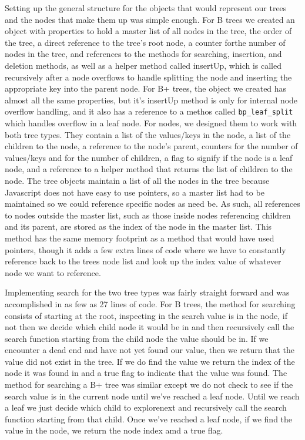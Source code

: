 Setting up the general structure for the objects that would represent
our trees and the nodes that make them up was simple enough.  For B
trees we created an object with properties to hold a master list of
all nodes in the tree, the order of the tree, a direct reference to
the tree's root node, a counter forthe number of nodes in the tree,
and references to the methods for searching, insertion, and deletion
methods, as well as a helper method called insertUp, which is called
recursively after a node overflows to handle splitting the node and
inserting the appropriate key into the parent node.  For B+ trees, the
object we created has almost all the same properties, but it's
insertUp method is only for internal node overflow handling, and it
also has a reference to a methos called \texttt{bp\_leaf\_split} which
handles overflow in a leaf node.  For nodes, we designed them to work
with both tree types.  They contain a list of the values/keys in the
node, a list of the children to the node, a reference to the node's
parent, counters for the number of values/keys and for the number of
children, a flag to signify if the node is a leaf node, and a
reference to a helper method that returns the list of children to the
node. The tree objects maintain a list of all the nodes in the tree
because Javascript does not have easy to use pointers, so a master
list had to be maintained so we could reference specific nodes as need
be.  As such, all references to nodes outside the master list, such as
those inside nodes referencing children and its parent, are stored as
the index of the node in the master list.  This method has the same
memory footprint as a method that would have used pointers, though it
adds a few extra lines of code where we have to constantly reference
back to the trees node list and look up the index value of whatever
node we want to reference.

Implementing search for the two tree types was fairly straight forward
and was accomplished in as few as 27 lines of code.  For B trees, the
method for searching consists of starting at the root, inspecting in
the search value is in the node, if not then we decide which child
node it would be in and then recursively call the search function
starting from the child node the value should be in.  If we encounter
a dead end and have not yet found our value, then we return that the
value did not exist in the tree.  If we do find the value we return
the index of the node it was found in and a true flag to indicate that
the value was found.  The method for searching a B+ tree was similar
except we do not check to see if the search value is in the current
node until we've reached a leaf node.  Until we reach a leaf we just
decide which child to explorenext and recursively call the search
function starting from that child.  Once we've reached a leaf node, if
we find the value in the node, we return the node index amd a true
flag.

